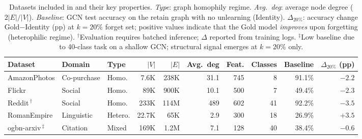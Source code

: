 \begin{table}[t]
\centering
\small
\caption{%
  Datasets included in \bench{} and their key properties.
  \textit{Type}: graph homophily regime.
  \textit{Avg.\ deg}: average node degree ($2|E|/|V|$).
  \textit{Baseline}: GCN test accuracy on the retain graph with no unlearning (Identity).
  $\Delta_{20\%}$: accuracy change Gold$-$Identity (pp) at $k{=}20\%$ forget set; positive values
  indicate that the Gold model \emph{improves} upon forgetting (heterophilic regime).
  $^{\dagger}$Evaluation requires batched inference; $\Delta$ reported from training logs.
  $^{\ddagger}$Low baseline due to 40-class task on a shallow GCN; structural signal emerges at $k{=}20\%$ only.%
}
\label{tab:datasets}
\setlength{\tabcolsep}{5pt}
\begin{tabular}{l l l r r r r r r r}
\toprule
Dataset & Domain & Type
  & $|V|$ & $|E|$ & Avg.\ deg & Feat. & Classes
  & Baseline & $\Delta_{20\%}$ (pp) \\
\midrule
AmazonPhotos
  & Co-purchase & Homo.
  & 7.6K & 238K & 31.1 & 745 & 8
  & 91.1\% & $-2.2$ \\
Flickr
  & Social      & Homo.
  & 89K  & 900K & 10.1 & 500 & 7
  & 49.4\% & $-2.3$ \\
Reddit\,$^{\dagger}$
  & Social      & Homo.
  & 233K & 114M & 489  & 602 & 41
  & 92.2\% & $-3.5$ \\
RomanEmpire
  & Linguistic  & Hetero.
  & 22.7K & 65K & 2.9  & 300 & 18
  & 26.9\% & $+3.5$ \\
ogbn-arxiv\,$^{\ddagger}$
  & Citation    & Mixed
  & 169K & 1.2M & 7.1  & 128 & 40
  & 38.4\% & $-0.6$ \\
\bottomrule
\end{tabular}
\end{table}
